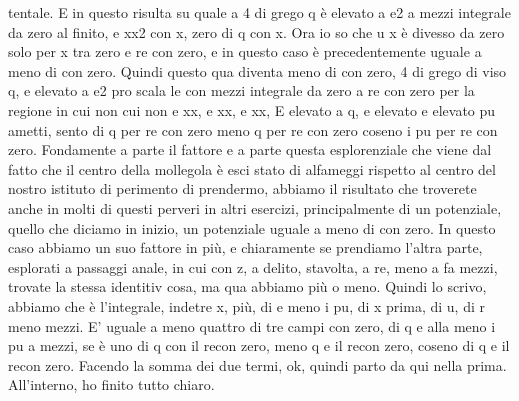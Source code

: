{\begin{soluzione}
tentale. E in questo risulta su quale a 4 di grego q è elevato a e2 a mezzi integrale da zero al finito, e xx2 con x, zero di q con x. Ora io so che u x è divesso da zero solo per x tra zero e re con zero, e in questo caso è precedentemente uguale a meno di con zero. Quindi questo qua diventa meno di con zero, 4 di grego di viso q, e elevato a e2 pro scala le con mezzi integrale da zero a re con zero per la regione in cui non cui non e xx, e xx, e xx, E elevato a q, e elevato e elevato pu ametti, sento di q per re con zero meno q per re con zero coseno i pu per re con zero. Fondamente a parte il fattore e a parte questa esplorenziale che viene dal fatto che il centro della mollegola è esci stato di alfameggi rispetto al centro del nostro istituto di perimento di prendermo, abbiamo il risultato che troverete anche in molti di questi perveri in altri esercizi, principalmente di un potenziale, quello che diciamo in inizio, un potenziale uguale a meno di con zero. In questo caso abbiamo un suo fattore in più, e chiaramente se prendiamo l'altra parte, esplorati a passaggi anale, in cui con z, a delito, stavolta, a re, meno a fa mezzi, trovate la stessa identitiv cosa, ma qua abbiamo più o meno. Quindi lo scrivo, abbiamo che è l'integrale, indetre x, più, di e meno i pu, di x prima, di u, di r meno mezzi. E' uguale a meno quattro di tre campi con zero, di q e alla meno i pu a mezzi, se è uno di q con il recon zero, meno q e il recon zero, coseno di q e il recon zero. Facendo la somma dei due termi, ok, quindi parto da qui nella prima. All'interno, ho finito tutto chiaro. 
   

\end{soluzione}}
